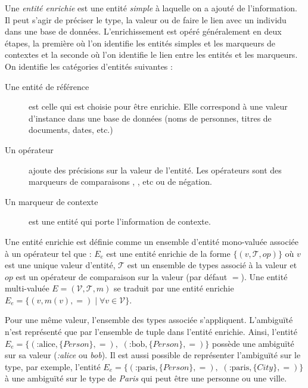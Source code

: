 Une \emph{entité enrichie} est une entité \emph{simple} à laquelle on a ajouté de l'information.
Il peut s'agir de préciser le type, la valeur ou de faire le lien avec un individu dans une base de données.
L'enrichissement est opéré généralement en deux étapes, la première où l'on identifie les entités simples et les marqueurs de contextes et la seconde où l'on identifie le lien entre les entités et les marqueurs.
On identifie les catégories d'entités suivantes :
\begin{description}
    \item[Une entité de référence] est celle qui est choisie pour être enrichie.
          Elle correspond à une valeur d'instance dans une base de données (noms de personnes, titres de documents, dates, etc.)
    \item[Un opérateur] ajoute des précisions sur la valeur de l'entité.
          Les opérateurs sont des marqueurs de comparaisons , , etc ou de négation.
    \item[Un marqueur de contexte] est une entité qui porte l'information de contexte.
\end{description}

\begin{definition}
      Une entité enrichie est définie comme un ensemble d'entité mono-valuée associée à un opérateur tel que :
      $E_e$ est une entité enrichie de la forme $\{(v, \mathcal{T}, op)\}$ où $v$ est une unique valeur d'entité, $\mathcal{T}$ est un ensemble de types associé à la valeur et $op$ est un opérateur de comparaison sur la valeur (par défaut $=$).
      Une entité multi-valuée $E = (\mathcal{V}, \mathcal{T}, m)$ se traduit par une entité enrichie $E_e = \{(v, m(v), =) \mid \forall v \in \mathcal{V}\}$.
\end{definition}

Pour une même valeur, l'ensemble des types associée s'appliquent.
L'ambiguïté n'est représenté que par l'ensemble de tuple dans l'entité enrichie.
Ainsi, l'entité $E_e = \{ (\text{:alice}, \{Person\}, =),$ $(\text{:bob}, \{Person\}, =) \}$ possède une ambiguïté sur sa valeur (\emph{:alice} ou \emph{bob}).
Il est aussi possible de représenter l'ambiguïté sur le type, par exemple, l'entité $E_e = \{ (\text{:paris}, \{Person\}, =),$ $(\text{:paris}, \{City\}, =) \}$ à une ambiguïté sur le type de \emph{Paris} qui peut être une personne ou une ville.

